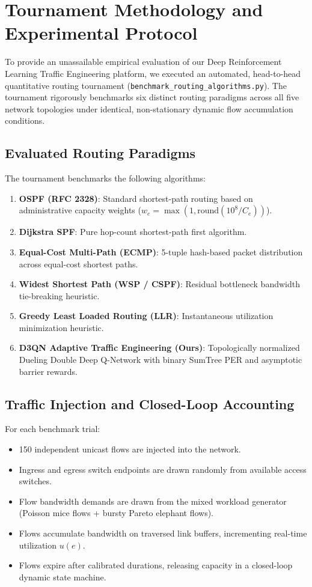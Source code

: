 \documentclass[12pt,a4paper,oneside]{report}
\begin{document}
\section{Tournament Methodology and Experimental Protocol}
To provide an unassailable empirical evaluation of our Deep Reinforcement Learning Traffic Engineering platform, we executed an automated, head-to-head quantitative routing tournament (\texttt{benchmark\_routing\_algorithms.py}). The tournament rigorously benchmarks six distinct routing paradigms across all five network topologies under identical, non-stationary dynamic flow accumulation conditions.

\subsection{Evaluated Routing Paradigms}
The tournament benchmarks the following algorithms:
\begin{enumerate}
    \item \textbf{OSPF (RFC 2328)}: Standard shortest-path routing based on administrative capacity weights ($w_e = \max(1, \text{round}(10^8 / C_e))$).
    \item \textbf{Dijkstra SPF}: Pure hop-count shortest-path first algorithm.
    \item \textbf{Equal-Cost Multi-Path (ECMP)}: 5-tuple hash-based packet distribution across equal-cost shortest paths.
    \item \textbf{Widest Shortest Path (WSP / CSPF)}: Residual bottleneck bandwidth tie-breaking heuristic.
    \item \textbf{Greedy Least Loaded Routing (LLR)}: Instantaneous utilization minimization heuristic.
    \item \textbf{D3QN Adaptive Traffic Engineering (Ours)}: Topologically normalized Dueling Double Deep Q-Network with binary SumTree PER and asymptotic barrier rewards.
\end{enumerate}

\subsection{Traffic Injection and Closed-Loop Accounting}
For each benchmark trial:
\begin{itemize}
    \item 150 independent unicast flows are injected into the network.
    \item Ingress and egress switch endpoints are drawn randomly from available access switches.
    \item Flow bandwidth demands are drawn from the mixed workload generator (Poisson mice flows + bursty Pareto elephant flows).
    \item Flows accumulate bandwidth on traversed link buffers, incrementing real-time utilization $u(e)$.
    \item Flows expire after calibrated durations, releasing capacity in a closed-loop dynamic state machine.
\end{itemize}
\end{document}
